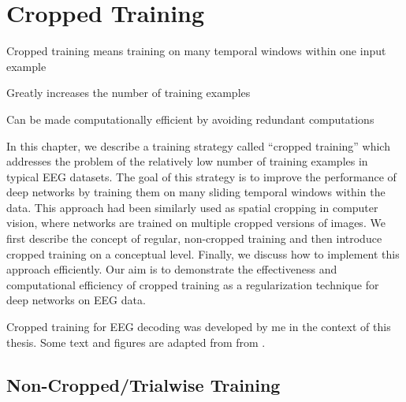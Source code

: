 \chapter{Cropped Training}\label{cropped-training}

\begin{startbox}{Cropped training means training on many temporal windows within one input example}  
\item Greatly increases the number of training examples
\item Can be made computationally efficient by avoiding redundant computations
\end{startbox}


    In this chapter, we describe a training strategy called ``cropped
training'' which addresses the problem of the relatively low number of
training examples in typical EEG datasets. The goal of this strategy is
to improve the performance of deep networks by training them on many
sliding temporal windows within the data. This approach had been
similarly used as spatial cropping in computer vision, where networks
are trained on multiple cropped versions of images. We first describe
the concept of regular, non-cropped training and then introduce cropped
training on a conceptual level. Finally, we discuss how to implement
this approach efficiently. Our aim is to demonstrate the effectiveness
and computational efficiency of cropped training as a regularization
technique for deep networks on EEG data.

Cropped training for EEG decoding was developed by me in the context of
this thesis. Some text and figures are adapted from from
\cite{schirrmeisterdeephbm2017}.


\section{Non-Cropped/Trialwise
Training}\label{non-croppedtrialwise-training}




